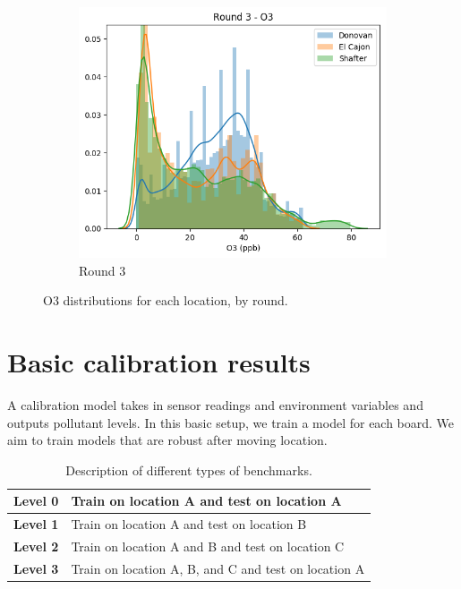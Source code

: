 \documentclass[journal abbreviation, manuscript]{copernicus}
\begin{document}
\begin{figure}[H]
\begin{subfigure}{0.32\textwidth}
\includegraphics[width=\textwidth]{results/distributions/round3_o3.png}
\caption{Round 3}
\end{subfigure}
\caption{O3 distributions for each location, by round.}
\label{fig:o3-rounds}
\end{figure}

\iffalse
\section{Basic calibration results}

A calibration model takes in sensor readings and environment
variables and outputs pollutant levels. In this basic setup,
we train a model for each board.
We aim to train models that are robust after moving location.

\begin{table}[H]
\centering
\begin{tabular}{|l|l|}
\hline
\textbf{Level 0} & Train on location A and test on location A \\ \hline
\textbf{Level 1} & Train on location A and test on location B \\ \hline
\textbf{Level 2} & Train on location A and B and test on location C \\ \hline
\textbf{Level 3} & Train on location A, B, and C and test on location A \\ \hline
\end{tabular}
\caption{Description of different types of benchmarks.}
\label{tab:levels}
\end{table}
\end{document}
